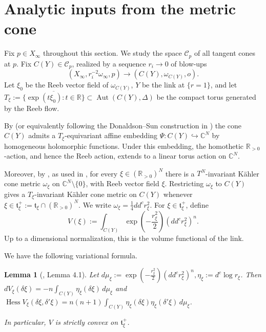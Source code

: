 \documentclass[11pt]{amsart}
\newtheorem{lemma}[theorem]{Lemma}
\theoremstyle{definition}
\theoremstyle{remark}
\begin{document}
\section{Analytic inputs from the metric cone}

Fix $p\in X_\infty$ throughout this section. We study the space
$\mathcal C_p$ of all tangent cones at $p$. Fix
$C(Y)\in\mathcal C_p$, realized by a sequence $r_i\to0$ of blow-ups
\[
(X_\infty,r_i^{-2}\omega_\infty,p)
\longrightarrow
(C(Y),\omega_{C(Y)},o).
\]
Let $\xi_0$ be the Reeb vector field of $\omega_{C(Y)}$, $Y$ be the link at
$\{r=1\}$, and let $T_\xi := \overline{\{\exp(t\xi_0):t\in \mathbb R\}} \subset \operatorname{Aut}(C(Y),\Delta)$ be the compact torus generated by the Reeb flow.

By \cite[Theorem 1 and Section 4]{SLII} (or equivalently following
the Donaldson--Sun construction in \cite[Section 2.3]{DSII}) the cone $C(Y)$
admits a $T_\xi$-equivariant affine embedding $\Psi:C(Y)\hookrightarrow \mathbb C^N$ by homogeneous holomorphic functions. Under this embedding, the homothetic
$\mathbb R_{>0}$-action, and hence the Reeb action, extends to a linear torus
action on $\mathbb C^N$.

Moreover, by \cite[Lemma 2.5]{HeSunFrankel}, as used in
\cite[Appendix, p.30]{DSII}, for every
$\xi\in (\mathbb R_{>0})^N$ there is a $T^N$-invariant K\"ahler cone metric
$\omega_\xi$ on $\mathbb C^N\setminus\{0\}$, with Reeb vector field $\xi$.
Restricting $\omega_\xi$ to $C(Y)$ gives a $T_\xi$-invariant K\"ahler cone
metric on $C(Y)$ whenever $\xi\in \mathfrak t_\xi^+ :=
\mathfrak t_\xi\cap (\mathbb R_{>0})^N$. We write $\omega_\xi=\frac{1}{4}dd^c r_\xi^2.$
For $\xi\in \mathfrak t_\xi^+$, define
\[
        V(\xi):=
        \int_{C(Y)}\exp\left(-\frac{r_\xi^2}{2}\right)
        (dd^c r_\xi^2)^n .
\]
Up to a dimensional normalization, this is the volume functional of the link.

We have the following variational formula.

\begin{lemma}[\cite{DSII}, Lemma 4.1]
Let $ d\mu_\xi:=\exp\left(-\frac{r_\xi^2}{2}\right) (dd^c r_\xi^2)^n, \eta_\xi:=d^c\log r_\xi$.
Then  $dV_\xi(\delta\xi) =  -n\int_{C(Y)}\eta_\xi(\delta\xi)\,d\mu_\xi$
and $\operatorname{Hess}V_\xi(\delta\xi,\delta'\xi)  =  n(n+1)\int_{C(Y)}  \eta_\xi(\delta\xi)\eta_\xi(\delta'\xi)\,d\mu_\xi$.

In particular, $V$ is strictly convex on $\mathfrak t_\xi^+$.
\end{lemma}
\end{document}
